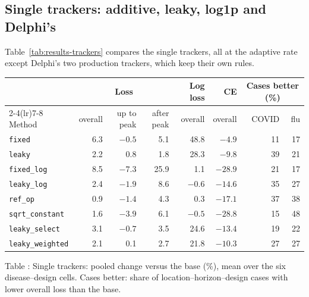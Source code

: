 \documentclass[11pt,a4paper]{article}
\theoremstyle{definition}
\theoremstyle{remark}
\begin{document}
\subsection{Single trackers: additive, leaky, log1p and Delphi's}
\label{sec:results-trackers}
Table~\ref{tab:results-trackers} compares the single trackers, all at the
adaptive rate except Delphi's two production trackers, which keep their
own rules.

\begin{center}\small
\renewcommand{\arraystretch}{1.15}
\begin{tabular}{@{}lrrrrrrr@{}}
\toprule
 & \multicolumn{3}{c}{Loss} & Log loss & CE & \multicolumn{2}{c}{Cases better (\%)}\\
\cmidrule(lr){2-4}\cmidrule(lr){7-8}
Method & overall & up to peak & after peak & overall & overall & COVID & flu\\
\midrule
\texttt{fixed}          & 6.3 & $-0.5$ & 5.1  & 48.8   & $-4.9$  & 11 & 17\\
\texttt{leaky}          & 2.2 & 0.8    & 1.8  & 28.3   & $-9.8$  & 39 & 21\\
\texttt{fixed\_log}     & 8.5 & $-7.3$ & 25.9 & 1.1    & $-28.9$ & 21 & 17\\
\texttt{leaky\_log}     & 2.4 & $-1.9$ & 8.6  & $-0.6$ & $-14.6$ & 35 & 27\\
\texttt{ref\_op}        & 0.9 & $-1.4$ & 4.3  & 0.3    & $-17.1$ & 37 & 38\\
\texttt{sqrt\_constant} & 1.6 & $-3.9$ & 6.1  & $-0.5$ & $-28.8$ & 15 & 48\\
\addlinespace
\texttt{leaky\_select}   & 3.1 & $-0.7$ & 3.5 & 24.6 & $-13.4$ & 19 & 22\\
\texttt{leaky\_weighted} & 2.1 & 0.1    & 2.7 & 21.8 & $-10.3$ & 27 & 27\\
\bottomrule
\end{tabular}
\end{center}
\label{tab:results-trackers}
\begin{center}\small Table \thetable: Single trackers: pooled change versus
the base (\%), mean over the six disease--design cells. Cases better: share
of location--horizon--design cases with lower overall loss than the base.
\end{center}
\end{document}
